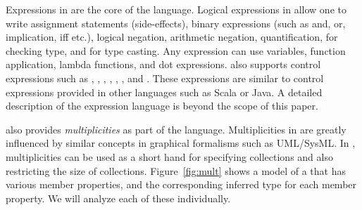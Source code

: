 Expressions in \Klang{} are the core of the language. Logical
expressions in \Klang{} allow one to write assignment statements
(side-effects), binary expressions (such as and, or, implication, iff
etc.), logical negation, arithmetic negation, quantification,
 for checking type, and  for type casting. Any
expression can use variables, function application, lambda functions,
and dot expressions. \Klang{} also supports control expressions such
as , , , ,
, , and . These expressions
are similar to control expressions provided in other languages such as
Scala or Java. A detailed description of the expression language is
beyond the scope of this paper. 

\Klang{} also provides {\em multiplicities} as part of the
language. Multiplicities in \Klang{} are greatly influenced by similar
concepts in graphical formalisms such as UML/SysML. In \Klang{},
multiplicities can be used as a short hand for specifying collections
and also restricting the size of collections. Figure~\ref{fig:mult}
shows a \Klang{} model of a  that has various member
properties, and the corresponding inferred type for each member
property. We will analyze each of these individually.


